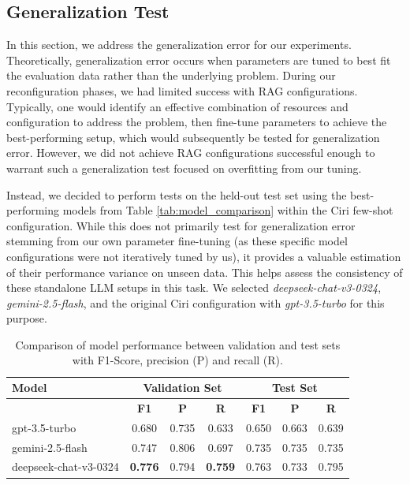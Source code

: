 \subsection{Generalization Test} \label{sec:exp_generalization}

In this section, we address the generalization error for our experiments. Theoretically, generalization error occurs when parameters are tuned to best fit the evaluation data rather than the underlying problem. During our reconfiguration phases, we had limited success with RAG configurations. Typically, one would identify an effective combination of resources and configuration to address the problem, then fine-tune parameters to achieve the best-performing setup, which would subsequently be tested for generalization error. However, we did not achieve RAG configurations successful enough to warrant such a generalization test focused on overfitting from our tuning.

Instead, we decided to perform tests on the held-out test set using the best-performing models from Table \ref{tab:model_comparison} within the Ciri few-shot configuration. While this does not primarily test for generalization error stemming from our own parameter fine-tuning (as these specific model configurations were not iteratively tuned by us), it provides a valuable estimation of their performance variance on unseen data. This helps assess the consistency of these standalone LLM setups in this task. We selected \textit{deepseek-chat-v3-0324}, \textit{gemini-2.5-flash}, and the original Ciri configuration with \textit{gpt-3.5-turbo} for this purpose. 

\begin{table}[h]
    \centering
    \begin{tabular}{|l|c|c|c|c|c|c|}
        \hline
        \textbf{Model} & \multicolumn{3}{c|}{\textbf{Validation Set}} & \multicolumn{3}{c|}{\textbf{Test Set}} \\
        \hline
        & \textbf{F1} & \textbf{P} & \textbf{R} & \textbf{F1} &  \textbf{P} & \textbf{R} \\
        \hline
        gpt-3.5-turbo          & 0.680 & 0.735 & 0.633 & 0.650 & 0.663 & 0.639 \\
        gemini-2.5-flash       & 0.747 & 0.806 & 0.697 & 0.735 & 0.735 & 0.735 \\
        deepseek-chat-v3-0324  & \textbf{0.776} & 0.794 & \textbf{0.759} & 0.763 & 0.733 & 0.795 \\
        \hline
    \end{tabular}
    \caption{Comparison of model performance between validation and test sets with F1-Score, precision (P) and recall (R).}
    \label{tab:generalization_comparison}
\end{table}



